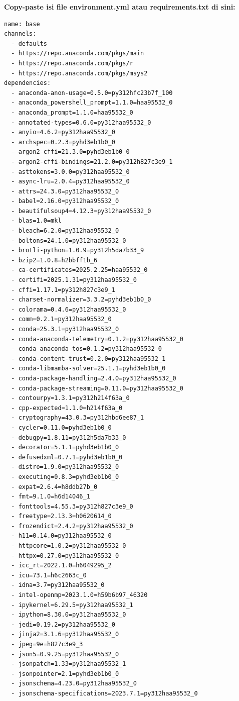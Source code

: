 \documentclass[11pt,a4paper]{article}
\begin{document}
\textbf{Copy-paste isi file environment.yml atau requirements.txt di sini:}

\begin{lstlisting}[caption=Requirements file For Environment Reproduction]
name: base
channels:
  - defaults
  - https://repo.anaconda.com/pkgs/main
  - https://repo.anaconda.com/pkgs/r
  - https://repo.anaconda.com/pkgs/msys2
dependencies:
  - anaconda-anon-usage=0.5.0=py312hfc23b7f_100
  - anaconda_powershell_prompt=1.1.0=haa95532_0
  - anaconda_prompt=1.1.0=haa95532_0
  - annotated-types=0.6.0=py312haa95532_0
  - anyio=4.6.2=py312haa95532_0
  - archspec=0.2.3=pyhd3eb1b0_0
  - argon2-cffi=21.3.0=pyhd3eb1b0_0
  - argon2-cffi-bindings=21.2.0=py312h827c3e9_1
  - asttokens=3.0.0=py312haa95532_0
  - async-lru=2.0.4=py312haa95532_0
  - attrs=24.3.0=py312haa95532_0
  - babel=2.16.0=py312haa95532_0
  - beautifulsoup4=4.12.3=py312haa95532_0
  - blas=1.0=mkl
  - bleach=6.2.0=py312haa95532_0
  - boltons=24.1.0=py312haa95532_0
  - brotli-python=1.0.9=py312h5da7b33_9
  - bzip2=1.0.8=h2bbff1b_6
  - ca-certificates=2025.2.25=haa95532_0
  - certifi=2025.1.31=py312haa95532_0
  - cffi=1.17.1=py312h827c3e9_1
  - charset-normalizer=3.3.2=pyhd3eb1b0_0
  - colorama=0.4.6=py312haa95532_0
  - comm=0.2.1=py312haa95532_0
  - conda=25.3.1=py312haa95532_0
  - conda-anaconda-telemetry=0.1.2=py312haa95532_0
  - conda-anaconda-tos=0.1.2=py312haa95532_0
  - conda-content-trust=0.2.0=py312haa95532_1
  - conda-libmamba-solver=25.1.1=pyhd3eb1b0_0
  - conda-package-handling=2.4.0=py312haa95532_0
  - conda-package-streaming=0.11.0=py312haa95532_0
  - contourpy=1.3.1=py312h214f63a_0
  - cpp-expected=1.1.0=h214f63a_0
  - cryptography=43.0.3=py312hbd6ee87_1
  - cycler=0.11.0=pyhd3eb1b0_0
  - debugpy=1.8.11=py312h5da7b33_0
  - decorator=5.1.1=pyhd3eb1b0_0
  - defusedxml=0.7.1=pyhd3eb1b0_0
  - distro=1.9.0=py312haa95532_0
  - executing=0.8.3=pyhd3eb1b0_0
  - expat=2.6.4=h8ddb27b_0
  - fmt=9.1.0=h6d14046_1
  - fonttools=4.55.3=py312h827c3e9_0
  - freetype=2.13.3=h0620614_0
  - frozendict=2.4.2=py312haa95532_0
  - h11=0.14.0=py312haa95532_0
  - httpcore=1.0.2=py312haa95532_0
  - httpx=0.27.0=py312haa95532_0
  - icc_rt=2022.1.0=h6049295_2
  - icu=73.1=h6c2663c_0
  - idna=3.7=py312haa95532_0
  - intel-openmp=2023.1.0=h59b6b97_46320
  - ipykernel=6.29.5=py312haa95532_1
  - ipython=8.30.0=py312haa95532_0
  - jedi=0.19.2=py312haa95532_0
  - jinja2=3.1.6=py312haa95532_0
  - jpeg=9e=h827c3e9_3
  - json5=0.9.25=py312haa95532_0
  - jsonpatch=1.33=py312haa95532_1
  - jsonpointer=2.1=pyhd3eb1b0_0
  - jsonschema=4.23.0=py312haa95532_0
  - jsonschema-specifications=2023.7.1=py312haa95532_0

\end{lstlisting}
\end{document}
